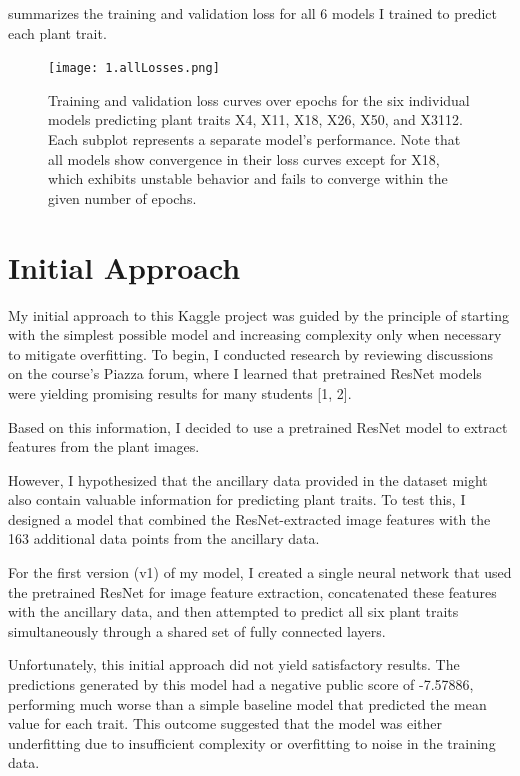 \documentclass{article}
\begin{document}
 summarizes the training and validation loss for all 6 models I trained to predict each plant trait.

\begin{figure}[h]
\centering
\texttt{[image: 1.allLosses.png]}
\caption{Training and validation loss curves over epochs for the six individual models predicting plant traits X4, X11, X18, X26, X50, and X3112. Each subplot represents a separate model's performance. Note that all models show convergence in their loss curves except for X18, which exhibits unstable behavior and fails to converge within the given number of epochs.}
\label{fig:trait_model_losses}
\end{figure}

\section{Initial Approach}

My initial approach to this Kaggle project was guided by the principle of starting with the simplest possible model and increasing complexity only when necessary to mitigate overfitting. To begin, I conducted research by reviewing discussions on the course's Piazza forum, where I learned that pretrained ResNet models were yielding promising results for many students [1, 2].

Based on this information, I decided to use a pretrained ResNet model to extract features from the plant images.

However, I hypothesized that the ancillary data provided in the dataset might also contain valuable information for predicting plant traits. To test this, I designed a model that combined the ResNet-extracted image features with the 163 additional data points from the ancillary data.

For the first version (v1) of my model, I created a single neural network that used the pretrained ResNet for image feature extraction, concatenated these features with the ancillary data, and then attempted to predict all six plant traits simultaneously through a shared set of fully connected layers.

Unfortunately, this initial approach did not yield satisfactory results. The predictions generated by this model had a negative public score of -7.57886, performing much worse than a simple baseline model that predicted the mean value for each trait. This outcome suggested that the model was either underfitting due to insufficient complexity or overfitting to noise in the training data. 
\end{document}
